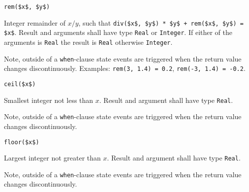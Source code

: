 \begin{operatordefinition}[rem]
\begin{synopsis}\begin{lstlisting}
rem($x$, $y$)
\end{lstlisting}\end{synopsis}
\begin{semantics}
Integer remainder of $x / y$, such that \lstinline!div($x$, $y$) * $y$ + rem($x$, $y$) = $x$!.
Result and arguments shall have type \lstinline!Real! or \lstinline!Integer!.
If either of the arguments is \lstinline!Real! the result is \lstinline!Real! otherwise \lstinline!Integer!.
\begin{nonnormative}
Note, outside of a \lstinline!when!-clause state events are triggered when the return value changes discontinuously.
Examples: \lstinline!rem(3, 1.4) = 0.2!, \lstinline!rem(-3, 1.4) = -0.2!.
\end{nonnormative}
\end{semantics}
\end{operatordefinition}

\begin{operatordefinition}[ceil]
\begin{synopsis}\begin{lstlisting}
ceil($x$)
\end{lstlisting}\end{synopsis}
\begin{semantics}
Smallest integer not less than $x$.
Result and argument shall have type \lstinline!Real!.
\begin{nonnormative}
Note, outside of a \lstinline!when!-clause state events are triggered when the return value changes discontinuously.
\end{nonnormative}
\end{semantics}
\end{operatordefinition}

\begin{operatordefinition}[floor]
\begin{synopsis}\begin{lstlisting}
floor($x$)
\end{lstlisting}\end{synopsis}
\begin{semantics}
Largest integer not greater than $x$.
Result and argument shall have type \lstinline!Real!.
\begin{nonnormative}
Note, outside of a \lstinline!when!-clause state events are triggered when the return value changes discontinuously.
\end{nonnormative}
\end{semantics}
\end{operatordefinition}

